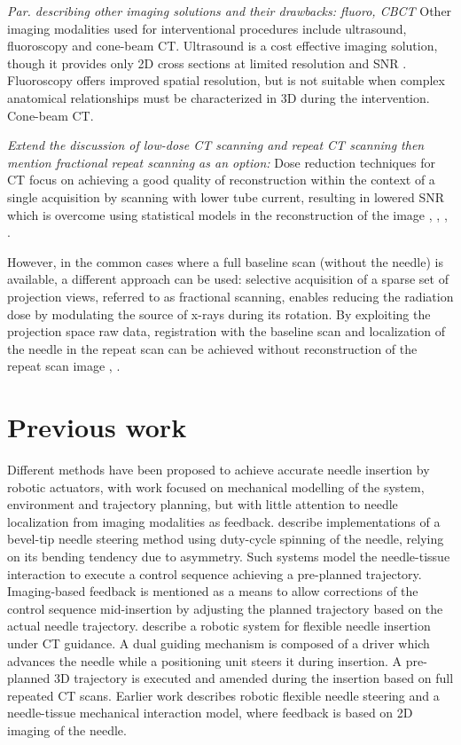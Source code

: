 \documentclass[letterpaper, 11 pt, conference]{ieeeconf}  %
\begin{document}
\textit{Par. describing other imaging solutions and their drawbacks: fluoro, CBCT}
Other imaging modalities used for interventional procedures include ultrasound, fluoroscopy and cone-beam CT.
Ultrasound is a cost effective imaging solution, though it provides only 2D cross sections at limited resolution and SNR \cite{sheafor2000comparison}.
Fluoroscopy offers improved spatial resolution, but is not suitable when complex anatomical relationships must be characterized in 3D during the intervention.
Cone-beam CT.
\cite{orth2008cbct} \cite{floridi2014cbct}

\textit{Extend the discussion of low-dose CT scanning and repeat CT scanning then mention fractional repeat scanning as an option:}
Dose reduction techniques for CT focus on achieving a good quality of reconstruction within the context of a single acquisition by scanning with lower tube current, resulting in lowered SNR which is overcome using statistical models in the reconstruction of the image \cite{zhang2016statistical}, \cite{kim2015sparseview}, \cite{niu2014sparse}, \cite{liu2014total}. 

However, in the common cases where a full baseline scan (without the needle) is available, a different approach can be used:
selective acquisition of a sparse set of projection views, referred to as fractional scanning, enables reducing the radiation dose by modulating the source of x-rays during its rotation. By exploiting the projection space raw data, registration with the baseline scan and localization of the needle in the repeat scan can be achieved without reconstruction of the repeat scan image \cite{medan2017sparse}, \cite{medan2017reduced}.

\section{Previous work}
Different methods have been proposed to achieve accurate needle insertion by robotic actuators, with work focused on mechanical modelling of the system, environment and trajectory planning, but with little attention to needle localization from imaging modalities as feedback.
\cite{wu2013automatic} \cite{engh2010percutaneous} describe implementations of a bevel-tip needle steering method using duty-cycle spinning of the needle, relying on its bending tendency due to asymmetry. Such systems model the needle-tissue interaction to execute a control sequence achieving a pre-planned trajectory. Imaging-based feedback is mentioned as a means to allow corrections of the control sequence mid-insertion by adjusting the planned trajectory based on the actual needle trajectory.
\cite{ben2018robotic} describe a robotic system for flexible needle insertion under CT guidance. A dual guiding mechanism is composed of a driver which advances the needle while a positioning unit steers it during insertion. A pre-planned 3D trajectory is executed and amended during the insertion based on full repeated CT scans.
Earlier work \cite{glozman2007image} describes robotic flexible needle steering and a needle-tissue mechanical interaction model, where feedback is based on 2D imaging of the needle.
\end{document}
